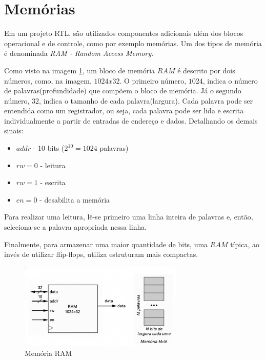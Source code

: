 \documentclass{article}
\begin{document}
\section{Memórias}


Em um projeto RTL, são utilizados componentes adicionais além dos blocos operacional e de controle, como por exemplo memórias. Um dos tipos de memória é denominada \textit{RAM - Random Access Memory}.

Como visto na imagem \ref{fig:ram}, um bloco de memória $RAM$ é descrito por dois números, como, na imagem, $1024x32$. O primeiro número, $1024$, indica o número de palavras(profundidade) que compõem o bloco de memória. Já o segundo número, $32$, indica o tamanho de cada palavra(largura). Cada palavra pode ser entendida como um registrador, ou seja, cada palavra pode ser lida e escrita individualmente a partir de entradas de endereço e dados. Detalhando os demais sinais:

\begin{itemize}
     \item $addr$ - 10 bits ($2^{10} = 1024$ palavras)
     \item $rw = 0$ - leitura
     \item $rw = 1$ - escrita
     \item $en = 0$ - desabilita a memória
\end{itemize}

Para realizar uma leitura, lê-se primeiro uma linha inteira de palavras e, então, seleciona-se a palavra apropriada nessa linha.

Finalmente, para armazenar uma maior quantidade de bits, uma $RAM$ típica, ao invés de utilizar flip-flops, utiliza estruturam mais compactas.


\begin{figure}[h!] 
    \centering 
    \includegraphics[width=0.7\textwidth]{RAM.jpg} %
    \caption{Memória RAM} 
    \label{fig:ram} 
\end{figure}
\end{document}
